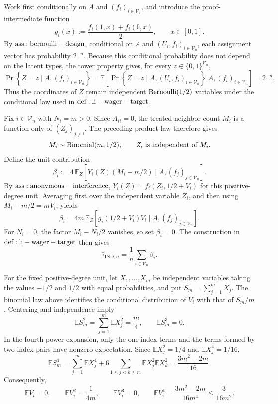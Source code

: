 Work first conditionally on \(A\) and \((f_i)_{i\in\mathcal V_n}\), and introduce the proof-intermediate function
\[
 g_i(x):=\frac{f_i(1,x)+f_i(0,x)}{2},\qquad x\in[0,1].
\]
By \({\rm ass:bernoulli-design}\), conditional on \(A\) and \((U_i,f_i)_{i\in\mathcal V_n}\), each assignment vector has probability \(2^{-n}\).  Because this conditional probability does not depend on the latent types, the tower property gives, for every \(z\in\{0,1\}^{\mathcal V_n}\),
\[
 \Pr\!\left\{Z=z\mid A,(f_i)_{i\in\mathcal V_n}\right\}
 =\mathbb E\!\left[
   \Pr\!\left\{Z=z\mid A,(U_i,f_i)_{i\in\mathcal V_n}\right\}
   \mathrel{\big|}A,(f_i)_{i\in\mathcal V_n}
 \right]
 =2^{-n}.
\]
Thus the coordinates of \(Z\) remain independent \({\rm Bernoulli}(1/2)\) variables under the conditional law used in \({\rm def:li-wager-target}\).

Fix \(i\in\mathcal V_n\) with \(N_i=m>0\).  Since \(A_{ii}=0\), the treated-neighbor count \(M_i\) is a function only of \((Z_j)_{j\ne i}\).  The preceding product law therefore gives
\[
 M_i\sim{\rm Binomial}(m,1/2),
 \qquad Z_i\ \text{is independent of }M_i.
\]
Define the unit contribution
\[
 \beta_i:=4\,\mathbb E_Z\!\left[
 Y_i(Z)(M_i-m/2)\mid A,(f_j)_{j\in\mathcal V_n}
 \right].
\]
By \({\rm ass:anonymous-interference}\), \(Y_i(Z)=f_i(Z_i,1/2+V_i)\) for this positive-degree unit.  Averaging first over the independent variable \(Z_i\), and then using \(M_i-m/2=mV_i\), yields
\[
 \beta_i
 =4m\,\mathbb E_Z\!\left[
 g_i(1/2+V_i)V_i\mid A,(f_j)_{j\in\mathcal V_n}
 \right].
\]
For \(N_i=0\), the factor \(M_i-N_i/2\) vanishes, so set \(\beta_i=0\).  The construction in \({\rm def:li-wager-target}\) then gives
\[
 \bar\tau_{\mathrm{IND},n}=\frac1n\sum_{i\in\mathcal V_n}\beta_i.
\]

For the fixed positive-degree unit, let \(X_1,\ldots,X_m\) be independent variables taking the values \(-1/2\) and \(1/2\) with equal probabilities, and put \(S_m=\sum_{j=1}^mX_j\).  The binomial law above identifies the conditional distribution of \(V_i\) with that of \(S_m/m\).  Centering and independence imply
\[
 \mathbb E S_m^2=\sum_{j=1}^m\mathbb E X_j^2=\frac m4,
 \qquad
 \mathbb E S_m^3=0.
\]
In the fourth-power expansion, only the one-index terms and the terms formed by two index pairs have nonzero expectation.  Since \(\mathbb E X_j^2=1/4\) and \(\mathbb E X_j^4=1/16\),
\[
 \mathbb E S_m^4
 =\sum_{j=1}^m\mathbb E X_j^4
 +6\sum_{1\le j<k\le m}\mathbb E X_j^2\mathbb E X_k^2
 =\frac{3m^2-2m}{16}.
\]
Consequently,
\[
 \mathbb E V_i=0,
 \qquad
 \mathbb E V_i^2=\frac1{4m},
 \qquad
 \mathbb E V_i^3=0,
 \qquad
 \mathbb E V_i^4=\frac{3m^2-2m}{16m^4}\le\frac3{16m^2}.
\]

